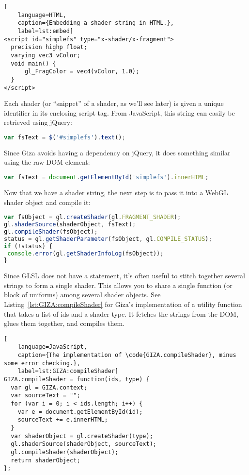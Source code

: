 \begin{lstlisting}[
    language=HTML,
    caption={Embedding a shader string in HTML.},
    label=lst:embed]
<script id="simplefs" type="x-shader/x-fragment">
  precision highp float;
  varying vec3 vColor;
  void main() {
      gl_FragColor = vec4(vColor, 1.0);
  }
</script>
\end{lstlisting}

Each shader (or ``snippet'' of a shader, as we'll see later) is given a unique identifier in its enclosing script tag.  From JavaScript, this string can easily be retrieved using jQuery:

\begin{lstlisting}[language=JavaScript]
var fsText = $('#simplefs').text();
\end{lstlisting} %

Since Giza avoids having a dependency on jQuery, it does something similar using the raw DOM element:

\begin{lstlisting}[language=JavaScript]
var fsText = document.getElementById('simplefs').innerHTML;
\end{lstlisting}

Now that we have a shader string, the next step is to pass it into a WebGL shader object and compile it:

\begin{lstlisting}[language=JavaScript]
var fsObject = gl.createShader(gl.FRAGMENT_SHADER);
gl.shaderSource(shaderObject, fsText);
gl.compileShader(fsObject);
status = gl.getShaderParameter(fsObject, gl.COMPILE_STATUS);
if (!status) {
 console.error(gl.getShaderInfoLog(fsObject));
}
\end{lstlisting}

Since GLSL does not have a  statement, it's often useful to stitch together several strings to form a single shader.  This allows you to share a single function (or block of uniforms) among several shader objects.  See Listing~\ref{lst:GIZA:compileShader} for Giza's implementation of a utility function that takes a list of ids and a shader type.  It fetches the strings from the DOM, glues them together, and compiles them.

\begin{lstlisting}[
    language=JavaScript,
    caption={The implementation of \code{GIZA.compileShader}, minus some error checking.},
    label=lst:GIZA:compileShader]
GIZA.compileShader = function(ids, type) {
  var gl = GIZA.context;
  var sourceText = "";
  for (var i = 0; i < ids.length; i++) {
    var e = document.getElementById(id);
    sourceText += e.innerHTML;
  }
  var shaderObject = gl.createShader(type);
  gl.shaderSource(shaderObject, sourceText);
  gl.compileShader(shaderObject);
  return shaderObject;
};
\end{lstlisting}

